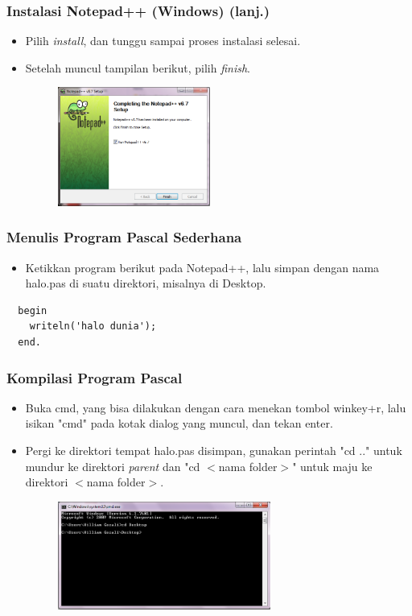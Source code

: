 \begin{frame}
\frametitle{Instalasi Notepad++ (Windows) (lanj.)}
\begin{itemize}
  \item Pilih \textit{install}, dan tunggu sampai proses instalasi selesai.
  \item Setelah muncul tampilan berikut, pilih \textit{finish}.
  \begin{figure}
    \includegraphics[width=5cm]{asset/npp_9.PNG}
  \end{figure}
\end{itemize}
\end{frame}

\begin{frame}[fragile]
\frametitle{Menulis Program Pascal Sederhana}
\begin{itemize}
  \item Ketikkan program berikut pada Notepad++, lalu simpan dengan nama halo.pas di suatu direktori, misalnya di Desktop.
\end{itemize}
\begin{lstlisting}
  begin
    writeln('halo dunia');
  end.
\end{lstlisting}
\end{frame}

\begin{frame}
\frametitle{Kompilasi Program Pascal}
\begin{itemize}
  \item Buka cmd, yang bisa dilakukan dengan cara menekan tombol winkey+r, lalu isikan "cmd" pada kotak dialog yang muncul, dan tekan enter.
  \item Pergi ke direktori tempat halo.pas disimpan, gunakan perintah "cd .." untuk mundur ke direktori \textit{parent} dan "cd $<$nama folder$>$" untuk maju ke direktori $<$nama folder$>$.
  \begin{figure}
    \includegraphics[width=7cm]{asset/hello_2.PNG}
  \end{figure}
\end{itemize}
\end{frame}


